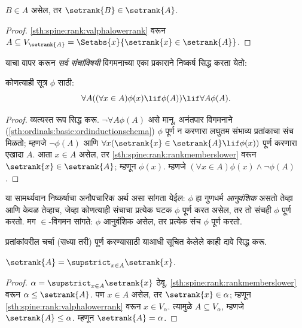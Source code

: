 \begin{prop}\label{sth:spine:rank:rankmemberslower}
$B \in A$ असेल, तर $\setrank{B} \in \setrank{A}$.
\end{prop}

\begin{proof}
\ref{sth:spine:rank:valphalowerrank} वरून $A \subseteq V_{\setrank{A}} = \Setabs{x}{\setrank{x} \in
\setrank{A}}$.
\end{proof}
\noindent
याचा वापर करून \emph{सर्व संचांविषयी} विगमनाच्या एका प्रकाराने निष्कर्ष सिद्ध करता येतो:

\begin{thm}[$\in$-विगमन रूपबंध]
कोणत्याही सूत्र $\phi$ साठी:
\[
	\forall A((\forall x \in A)\phi(x) \lif \phi(A)) \lif \forall A \phi(A).
\]
\end{thm}

\begin{proof}
व्यत्यस्त रूप सिद्ध करू. $\lnot \forall A
\phi(A)$ असे मानू. अनंतपार विगमनाने (\ref{sth:ordinals:basic:ordinductionschema}) $\phi$ पूर्ण न करणारा लघुतम संभाव्य प्रतांकाचा संच मिळतो; म्हणजे $\lnot \phi(A)$ आणि $\forall x(\setrank{x} \in \setrank{A}
\lif \phi(x))$ पूर्ण करणारा एखादा $A$. आता $x \in A$ असेल, तर \ref{sth:spine:rank:rankmemberslower} वरून $\setrank{x} \in
\setrank{A}$; म्हणून $\phi(x)$. म्हणजे $(\forall x \in
A)\phi(x) \land \lnot \phi(A)$.
\end{proof}\noindent या सामर्थ्यवान निष्कर्षाचा अनौपचारिक अर्थ असा सांगता येईल: $\phi$ हा गुणधर्म \emph{आनुवंशिक} असतो तेव्हा आणि केवळ तेव्हाच, जेव्हा कोणत्याही संचाचा प्रत्येक घटक $\phi$ पूर्ण करत असेल, तर तो संचही $\phi$ पूर्ण करतो. मग $\in$-विगमन सांगते: $\phi$ आनुवंशिक असेल, तर प्रत्येक संच $\phi$ पूर्ण करतो.

प्रतांकांवरील चर्चा (सध्या तरी) पूर्ण करण्यासाठी याआधी सूचित केलेले काही दावे सिद्ध करू.

\begin{prop}\label{sth:spine:rank:ranksupstrict}
$\setrank{A} = \supstrict_{x \in A}\setrank{x}$.
\end{prop}

\begin{proof}
$\alpha = \supstrict_{x \in A}\setrank{x}$ ठेवू. \ref{sth:spine:rank:rankmemberslower} वरून $\alpha \leq \setrank{A}$. पण $x \in A$ असेल, तर $\setrank{x} \in \alpha$; म्हणून \ref{sth:spine:rank:valphalowerrank} वरून $x \in V_\alpha$. त्यामुळे $A
\subseteq V_\alpha$, म्हणजे $\setrank{A} \leq \alpha$. म्हणून $\setrank{A} = \alpha$.
\end{proof}

